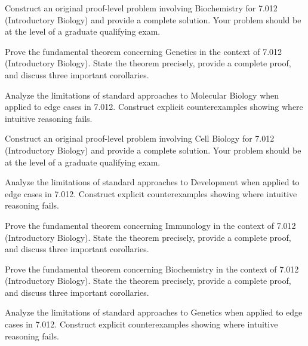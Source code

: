 \documentclass[12pt,a4paper]{exam}
\begin{document}
\begin{questions}

\question[4]
Construct an original proof-level problem involving Biochemistry for 7.012 (Introductory Biology) and provide a complete solution. Your problem should be at the level of a graduate qualifying exam.

\vspace{0.3cm}

\question[8]
Prove the fundamental theorem concerning Genetics in the context of 7.012 (Introductory Biology). State the theorem precisely, provide a complete proof, and discuss three important corollaries.

\vspace{0.3cm}

\question[6]
Analyze the limitations of standard approaches to Molecular Biology when applied to edge cases in 7.012. Construct explicit counterexamples showing where intuitive reasoning fails.

\vspace{0.3cm}

\question[3]
Construct an original proof-level problem involving Cell Biology for 7.012 (Introductory Biology) and provide a complete solution. Your problem should be at the level of a graduate qualifying exam.

\vspace{0.3cm}

\question[2]
Analyze the limitations of standard approaches to Development when applied to edge cases in 7.012. Construct explicit counterexamples showing where intuitive reasoning fails.

\vspace{0.3cm}

\question[5]
Prove the fundamental theorem concerning Immunology in the context of 7.012 (Introductory Biology). State the theorem precisely, provide a complete proof, and discuss three important corollaries.

\vspace{0.3cm}

\question[6]
Prove the fundamental theorem concerning Biochemistry in the context of 7.012 (Introductory Biology). State the theorem precisely, provide a complete proof, and discuss three important corollaries.

\vspace{0.3cm}

\question[6]
Analyze the limitations of standard approaches to Genetics when applied to edge cases in 7.012. Construct explicit counterexamples showing where intuitive reasoning fails.


\end{questions}
\end{document}
